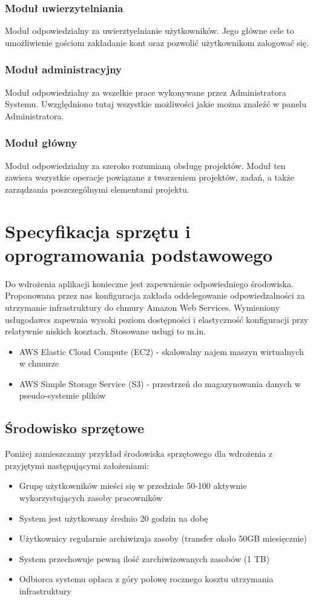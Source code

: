\documentclass[12pt, oneside, final]{report}
\begin{document}
\subsection{Moduł uwierzytelniania}
Moduł odpowiedzialny za uwierztyelnianie użytkowników. Jego główne cele to umożliwienie gościom zakładanie kont oraz pozwolić użytkownikom zalogować się.
\subsection{Moduł administracyjny}
Moduł odpowiedzialny za wszelkie prace wykonywane przez Administratora Systemu. Uwzględniono tutaj wszystkie możliwości jakie można znaleźć w panelu Administratora.
\subsection{Moduł główny}
Moduł odpowiedzialny za szeroko rozumianą obsługę projektów. Moduł ten zawiera wszystkie operacje powiązane z tworzeniem projektów, zadań, a także zarządzania poszczególnymi elementami projektu.

\chapter{Specyfikacja sprzętu i oprogramowania podstawowego}
Do wdrożenia aplikacji konieczne jest zapewnienie odpowiedniego środowiska. Proponowana przez nas konfiguracja zakłada oddelegowanie odpowiedzalności za utrzymanie infrastruktury do chmury Amazon Web Services. Wymieniony usługodawcs zapewnia wysoki poziom dostępności i elastyczność konfiguracji przy relatywnie niskich kosztach. Stosowane usługi to m.in.

\begin{itemize}
	\item AWS Elastic Cloud Compute (EC2) - skalowalny najem maszyn wirtualnych w chmurze
	\item AWS Simple Storage Service (S3) - przestrzeń do magazynowania danych w pseudo-systemie plików
\end{itemize}

\section{Środowisko sprzętowe}
Poniżej zamieszczamy przykład środowiska sprzętowego dla wdrożenia z przyjętymi następującymi założeniami:
\begin{itemize}
\item Grupę użytkowników mieści się w przedziale 50-100 aktywnie wykorzystujących zasoby pracowników
\item System jest użytkowany średnio 20 godzin na dobę
\item Użytkownicy regularnie archiwizuja zasoby (transfer około 50GB miesięcznie)
\item System przechowuje pewną ilość zarchiwizowanych zasobów (1 TB)
\item Odbiorca systemu opłaca z góry połowę rocznego kosztu utrzymania infrastruktury
\end{itemize}
\end{document}
